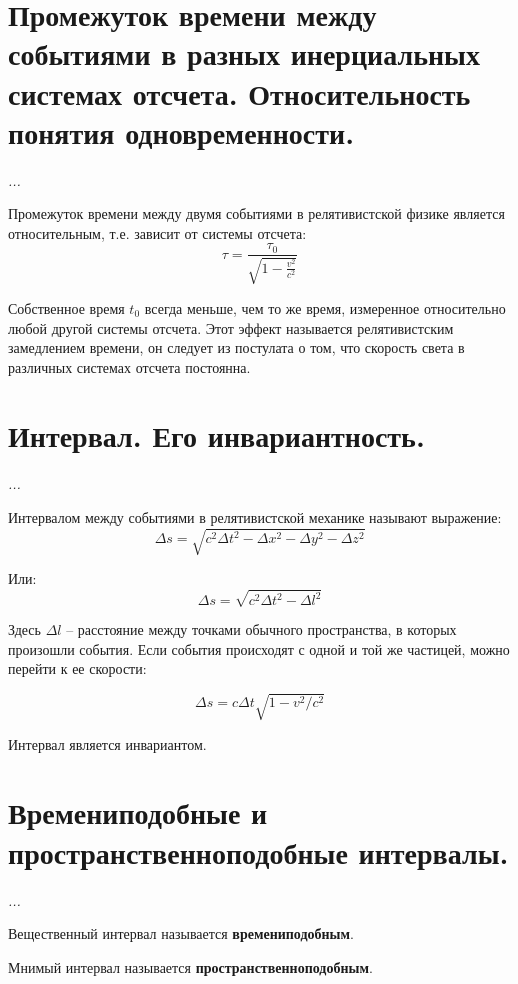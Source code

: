 \documentclass{article}
\begin{document}
    \section{Промежуток времени между событиями в разных инерциальных системах отсчета. Относительность понятия одновременности.}
    \par
      \textit{...}\\
    \par      
      Промежуток времени между двумя событиями в релятивистской физике является относительным, т.е. зависит от системы отсчета:
      \begin{equation}
	\tau = \frac{\tau_0}{\sqrt{1-\frac{v^2}{c^2}}}
      \end{equation}
    \par
      Собственное время $t_0$ всегда меньше, чем то же время, измеренное относительно любой другой системы отсчета. Этот эффект называется релятивистским замедлением времени, он следует из постулата о том, что скорость света в различных системах отсчета постоянна.
  \clearpage
  
    \section{Интервал. Его инвариантность.}
    \par
      \textit{...}\\
    \par    
      Интервалом между событиями в релятивистской механике называют выражение:
      \begin{equation}
	\Delta s = \sqrt{c^2\Delta t^2-\Delta x^2-\Delta y^2-\Delta z^2}
      \end{equation}
    \par
      Или:
      \begin{equation}
	\Delta s = \sqrt{c^2\Delta t^2-\Delta l^2}
      \end{equation}
    \par
      Здесь $\Delta l$ -- расстояние между точками обычного пространства, в которых произошли события. Если события происходят с одной и той же частицей, можно перейти к ее скорости:
    \par
      \begin{equation}
	\Delta s = c\Delta t\sqrt{1-v^2/c^2}
      \end{equation}
    \par
      Интервал является инвариантом.
  \clearpage
  
    \section{Времениподобные и пространственноподобные интервалы.}
    \par
      \textit{...}\\
    \par
      Вещественный интервал называется \textbf{времениподобным}.
    \par
      Мнимый интервал называется \textbf{пространственноподобным}.
  \clearpage    
\end{document}
